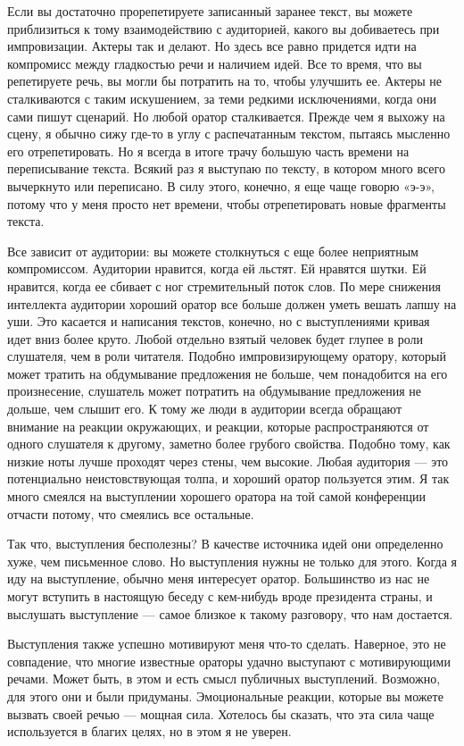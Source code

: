 \documentclass[ebook,12pt,oneside,openany]{memoir}
\begin{document}
Если вы достаточно прорепетируете записанный заранее текст, вы можете
приблизиться к тому взаимодействию с аудиторией, какого вы добиваетесь
при импровизации. Актеры так и делают. Но здесь все равно придется
идти на компромисс между гладкостью речи и наличием идей. Все то
время, что вы репетируете речь, вы могли бы потратить на то, чтобы
улучшить ее. Актеры не сталкиваются с таким искушением, за теми
редкими исключениями, когда они сами пишут сценарий. Но любой оратор
сталкивается. Прежде чем я выхожу на сцену, я обычно сижу где-то в
углу с распечатанным текстом, пытаясь мысленно его отрепетировать. Но
я всегда в итоге трачу большую часть времени на переписывание текста.
Всякий раз я выступаю по тексту, в котором много всего вычеркнуто или
переписано. В силу этого, конечно, я еще чаще говорю «э-э», потому что
у меня просто нет времени, чтобы отрепетировать новые фрагменты
текста.

Все зависит от аудитории: вы можете столкнуться с еще более неприятным
компромиссом. Аудитории нравится, когда ей льстят. Ей нравятся шутки.
Ей нравится, когда ее сбивает с ног стремительный поток слов. По мере
снижения интеллекта аудитории хороший оратор все больше должен уметь
вешать лапшу на уши. Это касается и написания текстов, конечно, но с
выступлениями кривая идет вниз более круто. Любой отдельно взятый
человек будет глупее в роли слушателя, чем в роли читателя. Подобно
импровизирующему оратору, который может тратить на обдумывание
предложения не больше, чем понадобится на его произнесение, слушатель
может потратить на обдумывание предложения не дольше, чем слышит его.
К тому же люди в аудитории всегда обращают внимание на реакции
окружающих, и реакции, которые распространяются от одного слушателя к
другому, заметно более грубого свойства. Подобно тому, как низкие ноты
лучше проходят через стены, чем высокие. Любая аудитория — это
потенциально неистовствующая толпа, и хороший оратор пользуется этим.
Я так много смеялся на выступлении хорошего оратора на той самой
конференции отчасти потому, что смеялись все остальные.

Так что, выступления бесполезны? В качестве источника идей они
определенно хуже, чем письменное слово. Но выступления нужны не только
для этого. Когда я иду на выступление, обычно меня интересует оратор.
Большинство из нас не могут вступить в настоящую беседу с кем-нибудь
вроде президента страны, и выслушать выступление — самое близкое к
такому разговору, что нам достается.

Выступления также успешно мотивируют меня что-то сделать. Наверное,
это не совпадение, что многие известные ораторы удачно выступают с
мотивирующими речами. Может быть, в этом и есть смысл публичных
выступлений. Возможно, для этого они и были придуманы. Эмоциональные
реакции, которые вы можете вызвать своей речью — мощная сила. Хотелось
бы сказать, что эта сила чаще используется в благих целях, но в этом я
не уверен.
\end{document}
